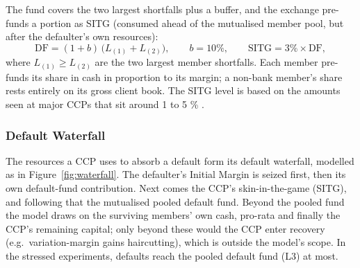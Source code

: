 The fund covers the two largest
shortfalls plus a buffer, and the exchange pre-funds a portion as
SITG (consumed ahead of the mutualised member pool, but after the defaulter's own
resources):
\begin{equation}
\label{eq:df}
\mathrm{DF} = (1+b)\,\bigl(L_{(1)} + L_{(2)}\bigr), \qquad b = 10\%, \qquad
\mathrm{SITG} = 3\%\times\mathrm{DF},
\end{equation}
where $L_{(1)} \ge L_{(2)}$ are the two largest member shortfalls.  Each member pre-funds its share in
cash in proportion to its margin; a non-bank member's share rests entirely on its gross client
book. The SITG level is based on the amounts seen at major CCPs that sit around 1 to 5 \% \citep{cftc_fcm,fia_tracker}.


\subsubsection{Default Waterfall}

The resources a CCP uses to absorb a default form its default waterfall, modelled as in
Figure~\ref{fig:waterfall}. The defaulter's Initial Margin is seized first, then its own default-fund
contribution. Next comes the CCP's skin-in-the-game (SITG), and following that the mutualised pooled
default fund. Beyond the pooled fund the model draws on the surviving members' own cash, pro-rata and finally the CCP's remaining capital; only beyond these would the
CCP enter recovery (e.g.\ variation-margin gains haircutting), which is outside the model's scope. In
the stressed experiments, defaults reach the pooled default fund (L3) at most.

